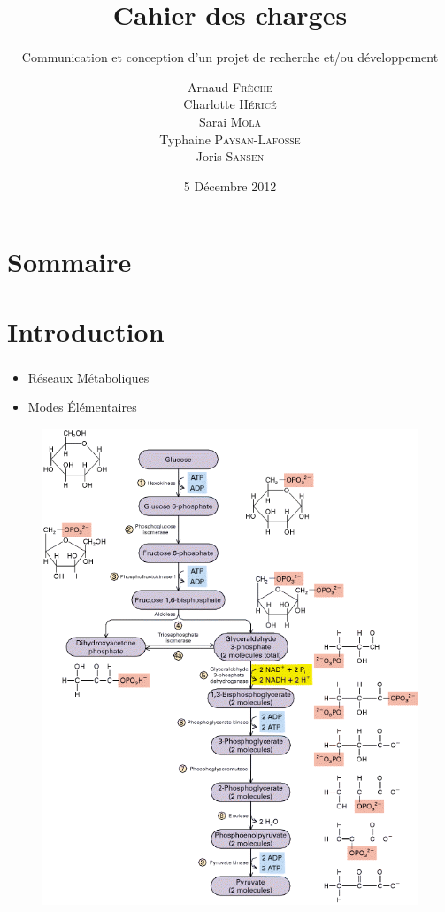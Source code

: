 \documentclass[11pt]{beamer}
\title{\textbf{Cahier des charges}}
\subtitle{Communication et conception d'un projet de recherche et/ou développement}
\date{5 Décembre 2012}
\author{Arnaud \textsc{Frèche} \\ Charlotte \textsc{Héricé} \\ Sarai \textsc{Mola}\\ Typhaine  \textsc{Paysan-Lafosse} \\ Joris \textsc{Sansen}}
\institute[Université Bordeaux 1] {Master 2 BioInformatique}
\begin{document}
\frame{\titlepage}

\section*{Sommaire}

\begin{frame}
  \tableofcontents
\end{frame}

\section{Introduction}			

\begin{frame}
	\frametitle{\secname}
		\begin{block}{}
			\begin{itemize}
				\item Réseaux Métaboliques
				\item Modes Élémentaires
			\end{itemize}
		\end{block}
	\begin{minipage}{6cm}
	\begin{figure}[h]
		\begin{center}
   			\begin{minipage}[c]{0.9\textwidth}
  				\includegraphics[scale=0.2]{glycolyse.png}

\end{minipage}
\end{center}
\end{figure}
\end{minipage}
\end{frame}
\end{document}
